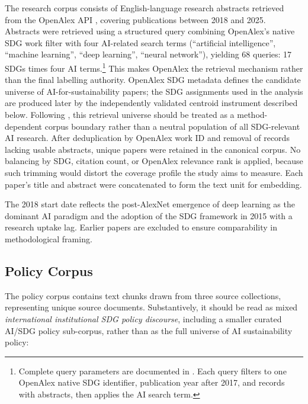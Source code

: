 \documentclass[12pt,a4paper]{article}
\begin{document}
The research corpus consists of \NResearchPapers{} English-language research abstracts retrieved from the OpenAlex API \parencite{Priem2022}, covering publications between 2018 and 2025. Abstracts were retrieved using a structured query combining OpenAlex's native SDG work filter with four AI-related search terms (``artificial intelligence'', ``machine learning'', ``deep learning'', ``neural network''), yielding 68 queries: 17 SDGs times four AI terms.\footnote{Complete query parameters are documented in . Each query filters to one OpenAlex native SDG identifier, publication year after 2017, and records with abstracts, then applies the AI search term.} This makes OpenAlex the retrieval mechanism rather than the final labelling authority. OpenAlex SDG metadata defines the candidate universe of AI-for-sustainability papers; the SDG assignments used in the analysis are produced later by the independently validated centroid instrument described below. Following \textcite{Armitage2020}, this retrieval universe should be treated as a method-dependent corpus boundary rather than a neutral population of all SDG-relevant AI research. After deduplication by OpenAlex work ID and removal of records lacking usable abstracts, \NResearchPapers{} unique papers were retained in the canonical corpus. No balancing by SDG, citation count, or OpenAlex relevance rank is applied, because such trimming would distort the coverage profile the study aims to measure. Each paper's title and abstract were concatenated to form the text unit for embedding.

The 2018 start date reflects the post-AlexNet emergence of deep learning as the dominant AI paradigm and the adoption of the SDG framework in 2015 with a research uptake lag. Earlier papers are excluded to ensure comparability in methodological framing.

\subsection{Policy Corpus}

The policy corpus contains \NPolicyChunks{} text chunks drawn from three source collections, representing \NPolicyDocs{} unique source documents. Substantively, it should be read as mixed \emph{international institutional SDG policy discourse}, including a smaller curated AI/SDG policy sub-corpus, rather than as the full universe of AI sustainability policy:
\end{document}
